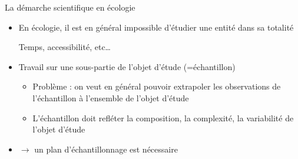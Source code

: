 \documentclass[10pt]{beamer}
\begin{document}
\begin{frame}{La démarche scientifique en écologie}
  \begin{itemize}
  \item En écologie, il est en général impossible d’étudier une entité
    dans sa totalité \\
    \begin{footnotesize}
    Temps, accessibilité, etc…      
    \end{footnotesize}
  \item Travail sur une sous-partie de l’objet d’étude (=échantillon)
    \begin{itemize}
    \item Problème : on veut en général pouvoir extrapoler les
      observations de l’échantillon à l’ensemble de l’objet d’étude
    \item L’échantillon doit refléter la composition, la complexité, la variabilité de l’objet d’étude
    \end{itemize}
  \item $\rightarrow$ un plan d’échantillonnage est nécessaire
  \end{itemize}
\end{frame}
\end{document}
